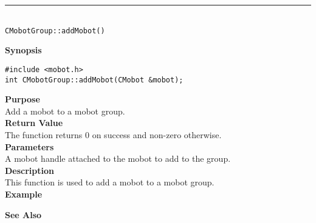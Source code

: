 \noindent
\vspace{5pt}
\rule{4.5in}{0.015in}\\
\noindent
{\LARGE \texttt{CMobotGroup::addMobot()}}\\
{}

\noindent
{\bf Synopsis}
\vspace{-8pt}
\begin{verbatim}
#include <mobot.h>
int CMobotGroup::addMobot(CMobot &mobot);
\end{verbatim}

\noindent
{\bf Purpose}\\
Add a mobot to a mobot group.\\

\noindent
{\bf Return Value}\\
The function returns 0 on success and non-zero otherwise.\\

\noindent
{\bf Parameters}\\
A mobot handle attached to the mobot to add to the group.\\

\noindent
{\bf Description}\\
This function is used to add a mobot to a mobot group. \\
\noindent
{\bf Example}\\
\noindent

\noindent
{\bf See Also}\\

